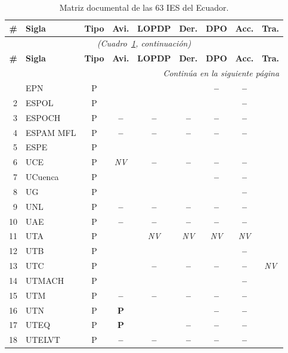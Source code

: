 \documentclass[pdflatex,sn-basic,Numbered]{sn-jnl}
\newcommand{\si}{\ding{51}}
\newcommand{\no}{\textcolor{gris}{\textbf{--}}}
\newcommand{\pc}{\textbf{P}}
\newcommand{\nv}{\textsl{\footnotesize NV}}
\theoremstyle{thmstyleone}
\theoremstyle{thmstyletwo}
\theoremstyle{thmstylethree}
\begin{document}
\begin{appendices}
\scriptsize
\setlength{\tabcolsep}{4pt}
\begin{longtable}{@{}r l c c c c c c c@{}}
	\caption{Matriz documental de las 63 IES del Ecuador.}\label{tab:ecuador}\\
	\toprule
	\textbf{\#} & \textbf{Sigla} & \textbf{Tipo} & \textbf{Avi.} & \textbf{LOPDP} & \textbf{Der.} & \textbf{DPO} & \textbf{Acc.} & \textbf{Tra.} \\
	\midrule
	\endfirsthead
	\multicolumn{9}{c}{\textit{(Cuadro~\ref{tab:ecuador}, continuaci\'on)}}\\
	\toprule
	\textbf{\#} & \textbf{Sigla} & \textbf{Tipo} & \textbf{Avi.} & \textbf{LOPDP} & \textbf{Der.} & \textbf{DPO} & \textbf{Acc.} & \textbf{Tra.} \\
	\midrule
	\endhead
	\midrule
	\multicolumn{9}{r}{\textit{Contin\'ua en la siguiente p\'agina}}\\
	\endfoot
	\bottomrule
	\endlastfoot
	1 & EPN & P & \si & \si & \si & \no & \no & \si \\
	2 & ESPOL & P & \si & \si & \si & \si & \no & \si \\
	3 & ESPOCH & P & \no & \no & \no & \no & \no & \si \\
	4 & ESPAM MFL & P & \no & \no & \no & \no & \no & \si \\
	5 & ESPE & P & \si & \si & \si & \si & \si & \si \\
	6 & UCE & P & \nv & \no & \no & \no & \no & \si \\
	7 & UCuenca & P & \si & \si & \si & \no & \no & \si \\
	8 & UG & P & \si & \si & \si & \si & \no & \si \\
	9 & UNL & P & \no & \no & \no & \no & \no & \si \\
	10 & UAE & P & \no & \no & \no & \no & \no & \si \\
	11 & UTA & P & \si & \nv & \nv & \nv & \nv & \si \\
	12 & UTB & P & \si & \si & \si & \si & \no & \si \\
	13 & UTC & P & \si & \no & \no & \no & \no & \nv \\
	14 & UTMACH & P & \si & \si & \si & \si & \no & \si \\
	15 & UTM & P & \no & \no & \no & \no & \no & \si \\
	16 & UTN & P & \pc & \si & \si & \no & \no & \si \\
	17 & UTEQ & P & \pc & \si & \no & \no & \no & \si \\
	18 & UTELVT & P & \no & \no & \no & \no & \no & \si \\

\end{longtable}
\end{appendices}
\end{document}
